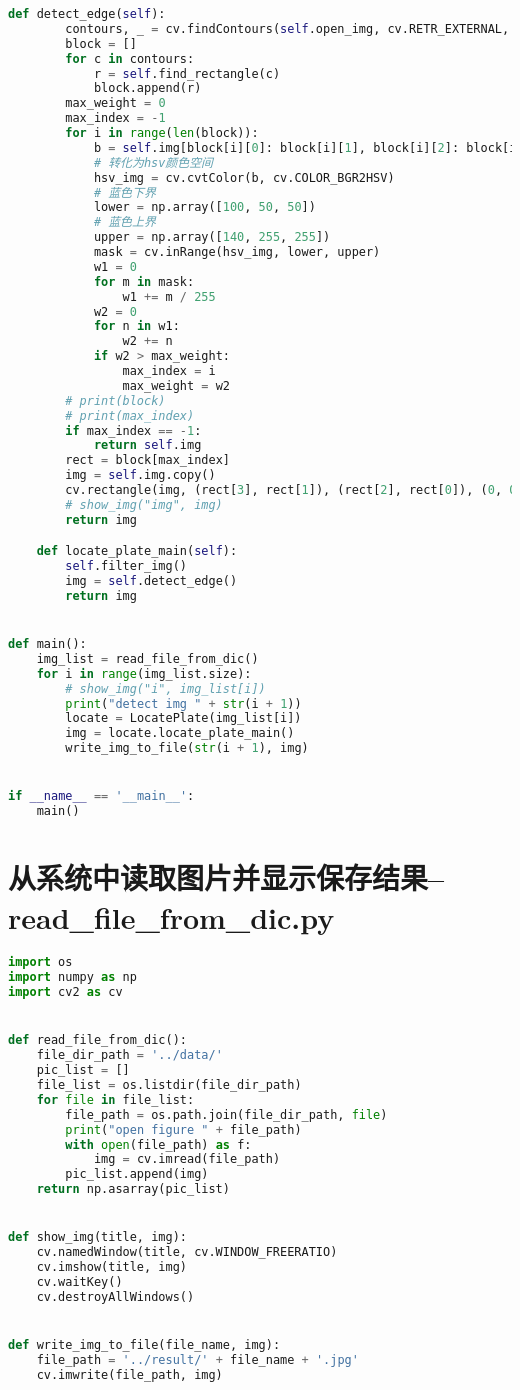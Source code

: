 \documentclass{hitreport}
\begin{document}
\begin{appendices}
\begin{lstlisting}[language=python]
    def detect_edge(self):
        contours, _ = cv.findContours(self.open_img, cv.RETR_EXTERNAL, cv.CHAIN_APPROX_SIMPLE)
        block = []
        for c in contours:
            r = self.find_rectangle(c)
            block.append(r)
        max_weight = 0
        max_index = -1
        for i in range(len(block)):
            b = self.img[block[i][0]: block[i][1], block[i][2]: block[i][3]]
            # 转化为hsv颜色空间
            hsv_img = cv.cvtColor(b, cv.COLOR_BGR2HSV)
            # 蓝色下界
            lower = np.array([100, 50, 50])
            # 蓝色上界
            upper = np.array([140, 255, 255])
            mask = cv.inRange(hsv_img, lower, upper)
            w1 = 0
            for m in mask:
                w1 += m / 255
            w2 = 0
            for n in w1:
                w2 += n
            if w2 > max_weight:
                max_index = i
                max_weight = w2
        # print(block)
        # print(max_index)
        if max_index == -1:
            return self.img
        rect = block[max_index]
        img = self.img.copy()
        cv.rectangle(img, (rect[3], rect[1]), (rect[2], rect[0]), (0, 0, 255), 2)
        # show_img("img", img)
        return img

    def locate_plate_main(self):
        self.filter_img()
        img = self.detect_edge()
        return img


def main():
    img_list = read_file_from_dic()
    for i in range(img_list.size):
        # show_img("i", img_list[i])
        print("detect img " + str(i + 1))
        locate = LocatePlate(img_list[i])
        img = locate.locate_plate_main()
        write_img_to_file(str(i + 1), img)


if __name__ == '__main__':
    main()


\end{lstlisting}

\section{从系统中读取图片并显示保存结果--read\_file\_from\_dic.py}\label{app:read}
\begin{lstlisting}[language=python]
import os
import numpy as np
import cv2 as cv


def read_file_from_dic():
    file_dir_path = '../data/'
    pic_list = []
    file_list = os.listdir(file_dir_path)
    for file in file_list:
        file_path = os.path.join(file_dir_path, file)
        print("open figure " + file_path)
        with open(file_path) as f:
            img = cv.imread(file_path)
        pic_list.append(img)
    return np.asarray(pic_list)


def show_img(title, img):
    cv.namedWindow(title, cv.WINDOW_FREERATIO)
    cv.imshow(title, img)
    cv.waitKey()
    cv.destroyAllWindows()


def write_img_to_file(file_name, img):
    file_path = '../result/' + file_name + '.jpg'
    cv.imwrite(file_path, img)

\end{lstlisting}

\end{appendices}
\end{document}
